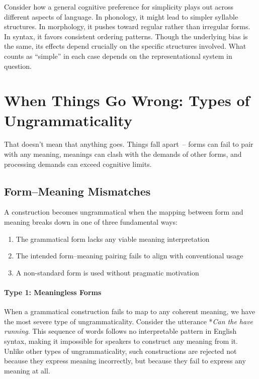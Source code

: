 Consider how a general cognitive preference for simplicity plays out across different aspects of language. In phonology, it might lead to simpler syllable structures. In morphology, it pushes toward regular rather than irregular forms. In syntax, it favors consistent ordering patterns. Though the underlying bias is the same, its effects depend crucially on the specific structures involved. What counts as ``simple'' in each case depends on the representational system in question.




\section{When Things Go Wrong: Types of Ungrammaticality}

That doesn't mean that anything goes. Things fall apart~-- forms can fail to pair with any meaning, meanings can clash with the demands of other forms, and processing demands can exceed cognitive limits.

\subsection{Form--Meaning Mismatches}
A construction becomes ungrammatical when the mapping between form and meaning breaks down in one of three fundamental ways:
\begin{enumerate}[noitemsep]
    \item The grammatical form lacks any viable meaning interpretation
    \item The intended form--meaning pairing fails to align with conventional usage
    \item A non-standard form is used without pragmatic motivation
\end{enumerate}

\paragraph*{Type 1: Meaningless Forms} When a grammatical construction fails to map to any coherent meaning, we have the most severe type of ungrammaticality. Consider the utterance *\textit{Can the have running}. This sequence of words follows no interpretable pattern in English syntax, making it impossible for speakers to construct any meaning from it. Unlike other types of ungrammaticality, such constructions are rejected not because they express meaning incorrectly, but because they fail to express any meaning at all.

